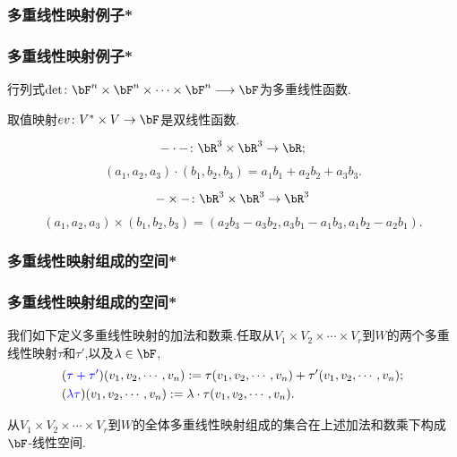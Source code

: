 \subsubsection{多重线性映射例子*}
\begin{frame}\frametitle{多重线性映射例子*}
\begin{example}[行列式]
行列式$\det \colon \bF^n \times \bF^n \times \cdots \times \bF^n \longrightarrow \bF$为多重线性函数.
\end{example}
\pp
\begin{example}[取值映射]
取值映射$ ev \colon V^*\times V\rightarrow \bF$是双线性函数.
\end{example}

\begin{example}[三维空间的点积]
\[-\cdot- \colon \bR^3\times\bR^3 \rightarrow \bR;\]
\[(a_1,a_2,a_3)\cdot(b_1,b_2,b_3)=a_1b_1+a_2b_2+a_3b_3.\]
\end{example}

\begin{example}[三维空间的叉积]
\[-\times- \colon \bR^3\times\bR^3 \rightarrow \bR^3\]
\[(a_1,a_2,a_3)\times(b_1,b_2,b_3) = (a_2b_3-a_3b_2,a_3b_1-a_1b_3,a_1b_2-a_2b_1).\]
\end{example}

\end{frame}





\subsubsection{多重线性映射组成的空间*}
\begin{frame}\frametitle{多重线性映射组成的空间*}
我们如下定义多重线性映射的加法和数乘.\pp 任取从$V_1\times V_2\times \cdots \times V_r$到$W$的两个多重线性映射$\tau$和$\tau'$,以及$\lambda\in\bF$,
\begin{equation*}
\begin{split}
& (\blue{\tau+\tau'})(v_1,v_2,\cdots,v_n):= \tau(v_1,v_2,\cdots,v_n) + \tau'(v_1,v_2,\cdots,v_n); \\
& (\blue{\lambda\tau})(v_1,v_2,\cdots,v_n):= \lambda\cdot \tau(v_1,v_2,\cdots,v_n).
\end{split}
\end{equation*}
\pp
\begin{proposition}
从$V_1\times V_2\times \cdots \times V_r$到$W$的全体多重线性映射组成的集合在上述加法和数乘下构成$\bF$-线性空间.
\end{proposition}

\end{frame}





